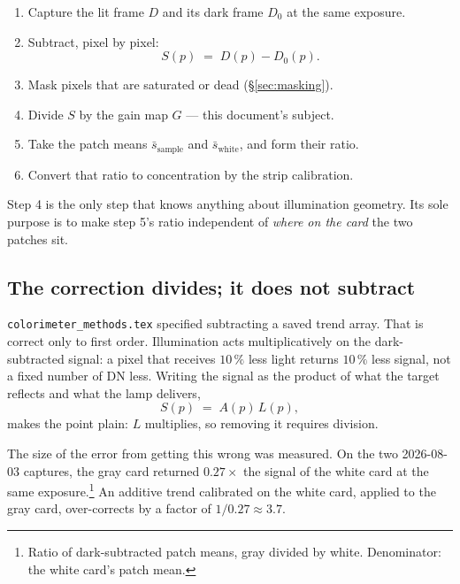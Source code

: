 \documentclass[11pt, a4paper]{article}
\newcommand{\code}[1]{\texttt{#1}}
\newcommand{\pct}{\,\%}
\begin{document}
\begin{enumerate}[nosep]
  \item Capture the lit frame $D$ and its dark frame $D_0$
        at the same exposure.
  \item Subtract, pixel by pixel:
        \begin{equation}
          S(p) \;=\; D(p) - D_0(p) .
          \label{eq:sig}
        \end{equation}
  \item Mask pixels that are saturated or dead (\S\ref{sec:masking}).
  \item Divide $S$ by the gain map $G$ --- this document's subject.
  \item Take the patch means $\bar{s}_{\mathrm{sample}}$
        and $\bar{s}_{\mathrm{white}}$,
        and form their ratio.
  \item Convert that ratio to concentration by the strip calibration.
\end{enumerate}

Step 4 is the only step that knows anything about illumination geometry.
Its sole purpose is to make step 5's ratio independent of
\emph{where on the card} the two patches sit.

\subsection{The correction divides; it does not subtract}
\label{sec:divide}

\code{colorimeter\_methods.tex} specified subtracting a saved trend array.
That is correct only to first order.
Illumination acts multiplicatively on the dark-subtracted signal:
a pixel that receives $10\pct$ less light returns $10\pct$ less signal,
not a fixed number of DN less.
Writing the signal as the product of what the target reflects
and what the lamp delivers,
\begin{equation}
  S(p) \;=\; A(p)\,L(p) ,
  \label{eq:model}
\end{equation}
makes the point plain:
$L$ multiplies, so removing it requires division.

The size of the error from getting this wrong was measured.
On the two 2026-08-03 captures,
the gray card returned $0.27\times$ the signal of the white card
at the same exposure.\footnote{Ratio of dark-subtracted patch means,
gray divided by white.
Denominator: the white card's patch mean.}
An additive trend calibrated on the white card,
applied to the gray card,
over-corrects by a factor of $1/0.27 \approx 3.7$.
\end{document}
